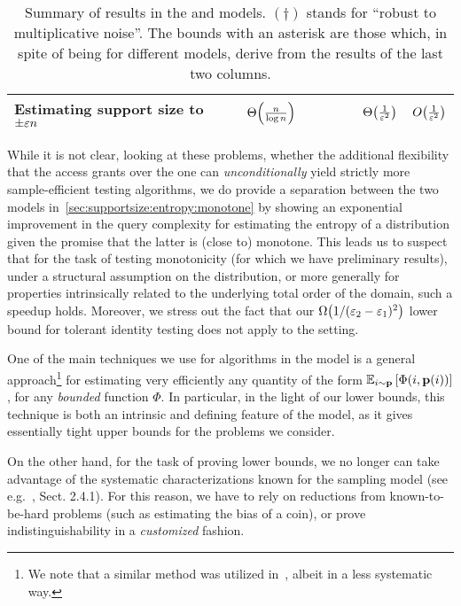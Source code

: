 \begin{table}[h]
\begin{adjustwidth}{-0.5in}{0.4in}
\begin{tabular}{|l|c|c|c||c|c|}
    \parbox{25mm}{ Estimating support size to $\pm\varepsilon n$ \strut } & $\bigTheta{\frac{n}{\log n}}$~\cite{ValiantValiant:11,ValiantValiant:10lb} & ~  & ~        & $\bigTheta{\frac{1}{\eps^{2}}}$             & $\bigO{\frac{1}{\eps^{2}}}$           \\ \hline
    \end{tabular}
\end{adjustwidth}
    \caption{\label{table:secextended:results} Summary of results in the \pdfsamp  and \cdfsamp  models. $(\dagger)$ stands for ``robust to multiplicative noise''. The bounds with an asterisk are those which, in spite of being for different models, derive from the results of the last two columns.}
\end{table}
 
While it is not clear, looking at these problems, whether the additional flexibility that the \Cdfsamp access grants over the \Pdfsamp one can \emph{unconditionally} yield strictly more sample-efficient testing algorithms, we do provide a separation between the two models in~\cref{sec:supportsize:entropy:monotone} by showing an exponential improvement in the query complexity for estimating the entropy of a distribution given the promise that the latter is (close to) monotone. This leads us to suspect that for the task of testing monotonicity (for which we have preliminary results), under a structural assumption on the distribution, or more generally for properties intrinsically related to the underlying total order of the domain, such a speedup holds.  Moreover, we stress out the fact that our $\bigOmega{1/(\eps_2-\eps_1)^2}$ lower bound for tolerant identity testing does not apply to the \Cdfsamp setting.

One of the main techniques we use for algorithms in the \pdfsamp model is a general approach\footnote{We note that a similar method was utilized in~\cite{BDKR:05}, albeit in a less systematic way.}{} for estimating very efficiently any quantity of the form
$\mathbb{E}_{i\sim \mathbf{p}}\left[ \Phi(i,\mathbf{p}(i)) \right]$, for any \emph{bounded} function $\Phi$. In particular, in the light of our lower bounds, this technique is both an intrinsic and defining feature of the \Pdfsamp model, as it gives essentially tight upper bounds for the problems we consider.

On the other hand, for the task of proving lower bounds, we no longer can take advantage of the systematic characterizations known for the sampling model  (see e.g.~\cite{BarYossef:02}, Sect. 2.4.1). For this reason, we have to rely on reductions from known-to-be-hard problems (such as estimating the bias of a coin), or prove indistinguishability in a \emph{customized} fashion.
  
